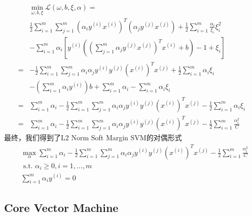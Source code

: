 \documentclass[UTF8, fleqn,10pt]{SelfArx} %
\begin{document}
	$$
	\begin{aligned} &\min _{\omega, b, \xi}\mathcal{L}(\omega, b, \xi, \alpha) =\\& \frac{1}{2} \sum_{i=1}^{m} \sum_{j=1}^{m}\left(\alpha_{i} y^{(i)} x^{(i)}\right)^{T}\left(\alpha_{j} y^{(j)} x^{(j)}\right)+\frac{1}{2} \sum_{i=1}^{m} \frac{\alpha_{i}}{\xi_{i}} \xi_{i}^{2} \\ &-\sum_{i=1}^{m} \alpha_{i}\left[y^{(i)}\left(\left(\sum_{j=1}^{m} \alpha_{j} y^{(j)} x^{(j)}\right)^{T} x^{(i)}+b\right)-1+\xi_{i}\right] \\=&-\frac{1}{2} \sum_{i=1}^{m} \sum_{j=1}^{m} \alpha_{i} \alpha_{j} y^{(i)} y^{(j)}\left(x^{(i)}\right)^{T} x^{(j)}+\frac{1}{2} \sum_{i=1}^{m} \alpha_{i} \xi_{i} \\ &-\left(\sum_{i=1}^{m} \alpha_{i} y^{(i)}\right) b+\sum_{i=1}^{m} \alpha_{i}-\sum_{i=1}^{m} \alpha_{i} \xi_{i} \\=& \sum_{i=1}^{m} \alpha_{i}-\frac{1}{2} \sum_{i=1}^{m} \sum_{j=1}^{m} \alpha_{i} \alpha_{j} y^{(i)} y^{(j)}\left(x^{(i)}\right)^{T} x^{(j)}-\frac{1}{2} \sum_{i=1}^{m} \alpha_{i} \xi_{i} \\=& \sum_{i=1}^{m} \alpha_{i}-\frac{1}{2} \sum_{i=1}^{m} \sum_{j=1}^{m} \alpha_{i} \alpha_{j} y^{(i)} y^{(j)}\left(x^{(i)}\right)^{T} x^{(j)}-\frac{1}{2} \sum_{i=1}^{m} \frac{\alpha_{i}^{2}}{C} \end{aligned}
	$$
	最终，我们得到了L2 Norm Soft Margin SVM的对偶形式
	\begin{equation}
	\begin{aligned} &\max _{\alpha} \sum_{i=1}^{m} \alpha_{i}-\frac{1}{2} \sum_{i=1}^{m} \sum_{j=1}^{m} \alpha_{i} \alpha_{j} y^{(i)} y^{(j)}\left(x^{(i)}\right)^{T} x^{(j)}-\frac{1}{2} \sum_{i=1}^{m} \frac{\alpha_{i}^{2}}{C} \\ &\text { s.t. }  \alpha_{i} \geq 0, i=1, \ldots, m \\ & \sum_{i=1}^{m} \alpha_{i} y^{(i)}=0 \end{aligned}
	\end{equation}
	\subsection{Core Vector Machine}
\end{document}
